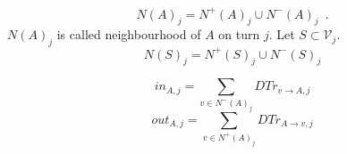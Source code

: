 \documentclass[11pt]{llncs}
\theoremstyle{definition}
\begin{document}
\begin{definition}[Neighbourhood]
\begin{enumerate}
              \begin{equation}
                 N\left(A\right)_j = N^{+}\left(A\right)_j \cup N^{-}\left(A\right)_j \enspace.
              \end{equation}
              $N\left(A\right)_j$ is called neighbourhood of $A$ on turn $j$. Let $S \subset \mathcal{V}_j$.
              \begin{equation}
                 N\left(S\right)_j = N^{+}\left(S\right)_j \cup N^{-}\left(S\right)_j
              \end{equation}
        \end{enumerate}
     \end{definition}
     \begin{definition}
     \label{inouttrust}
        \begin{equation}
           in_{A, j} = \sum\limits_{v \in N^{-}\left(A\right)_j}DTr_{v \rightarrow A, j}
        \end{equation}
        \begin{equation}
           out_{A, j} = \sum\limits_{v \in N^{+}\left(A\right)_j}DTr_{A \rightarrow v, j}
        \end{equation}
     \end{definition}
     
\end{document}

